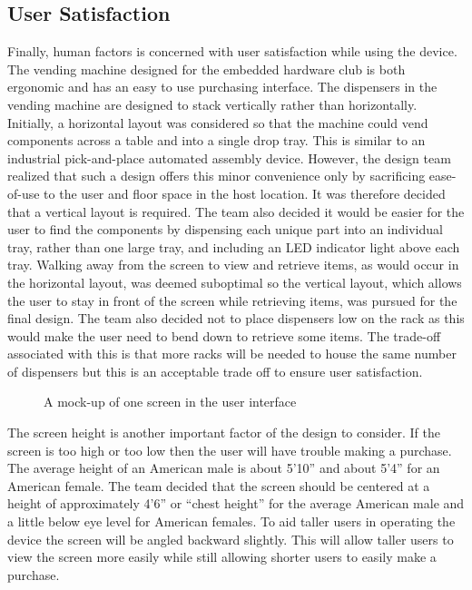 \documentclass[12pt,oneside,final]{article}
\begin{document}
\subsection{User Satisfaction}
Finally, human factors is concerned with user satisfaction while using the device. The vending machine designed for the embedded hardware club is both ergonomic and has an easy to use purchasing interface. The dispensers in the vending machine are designed to stack vertically rather than horizontally. Initially, a horizontal layout was considered so that the machine could vend components across a table and into a single drop tray. This is similar to an industrial pick-and-place automated assembly device. However, the design team realized that such a design offers this minor convenience only by sacrificing ease-of-use to the user and floor space in the host location. It was therefore decided that a vertical layout is required. The team also decided it would be easier for the user to find the components by dispensing each unique part into an individual tray, rather than one large tray, and including an LED indicator light above each tray. Walking away from the screen to view and retrieve items, as would occur in the horizontal layout, was deemed suboptimal so the vertical layout, which allows the user to stay in front of the screen while retrieving items, was pursued for the final design. The team also decided not to place dispensers low on the rack as this would make the user need to bend down to retrieve some items. The trade-off associated with this is that more racks will be needed to house the same number of dispensers but this is an acceptable trade off to ensure user satisfaction.

\begin{figure}[t]%
  \centering%
  \caption{A mock-up of one screen in the user interface}%
  \label{fig:gui}%
\end{figure}

The screen height is another important factor of the design to consider. If the screen is too high or too low then the user will have trouble making a purchase. The average height of an American male is about 5'10'' and about 5'4'' for an American female. The team decided that the screen should be centered at a height of approximately 4'6'' or ``chest height'' for the average American male and a little below eye level for American females. To aid taller users in operating the device the screen will be angled backward slightly. This will allow taller users to view the screen more easily while still allowing shorter users to easily make a purchase.
\end{document}
